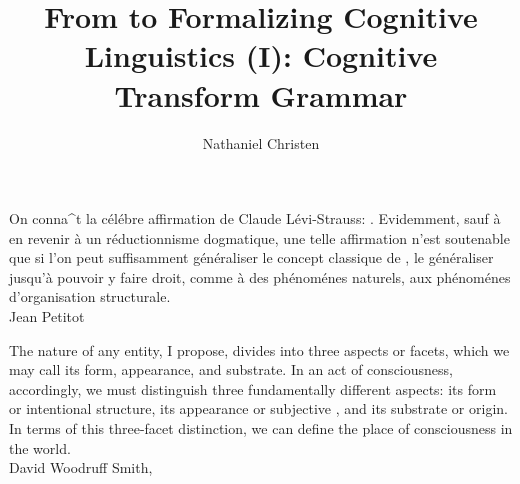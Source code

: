 \documentclass[10pt,twocolumn]{article}
\begin{document}
\title{From  to 
Formalizing Cognitive Linguistics (I): Cognitive Transform Grammar}
\author{Nathaniel Christen}

\newsavebox{\qboxi}
\newsavebox{\qboxii}

\begin{lrbox}{\qboxi}
\begin{frquote}
On conna\^{\inodot}t la c\'{e}l\'{e}bre 
affirmation de Claude L\'{e}vi-Strauss:
.  Evidemment, sauf 
\`{a} en revenir \`{a} un r\'{e}ductionnisme dogmatique, une telle
affirmation n'est soutenable que si l'on peut suffisamment 
g\'{e}n\'{e}raliser le concept
classique de , 
le g\'{e}n\'{e}raliser jusqu'\`{a} pouvoir y faire droit, 
comme \`{a} des ph\'{e}nom\'{e}nes naturels, aux 
ph\'{e}nom\'{e}nes d'organisation structurale. 
\\ \longdash{} Jean Petitot \cite[p. 1]{PetitotSyntaxe}
\end{frquote}
\end{lrbox}

\begin{lrbox}{\qboxii}
\begin{frquote}
The nature of any entity, I propose, divides into three aspects 
or facets, which we may call its form, appearance, and substrate.  
In an act of consciousness, accordingly, we must distinguish three 
fundamentally different aspects: its form or intentional structure, 
its appearance or subjective , and its substrate or 
origin.  In terms of this three-facet distinction, we can define 
the place of consciousness in the world.
\\ \longdash{} David Woodruff Smith, \cite[p. 11]{DavidWoodruffSmith}
\end{frquote}
\end{lrbox}
\end{document}

